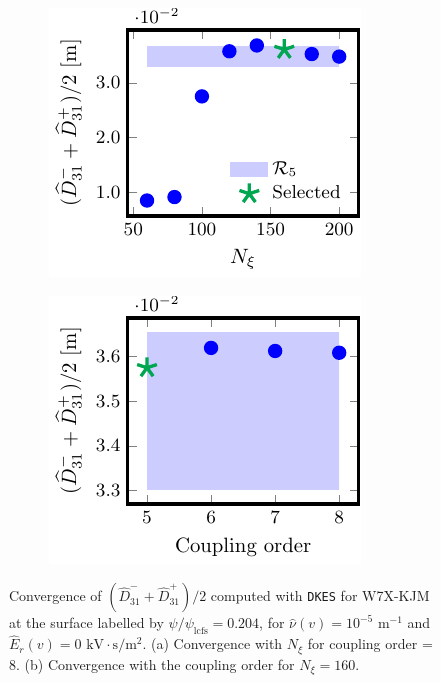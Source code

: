 \documentclass[10pt]{iopart}
\newcommand{\DKES}{{\texttt{DKES}}}
\begin{document}
\begin{figure}[t]
	\centering	
	\begin{subfigure}[t]{0.32\textwidth}
		\includegraphics{DKES-Convergence-Legendre-W7X-KJM-s0204-Er-0-D31-Detail}
%		
		\caption{}
		\label{subfig:DKES_D31_convergence_Legendre_W7X_KJM_0204_Erho_0_Detail}
	\end{subfigure}
	\begin{subfigure}[t]{0.32\textwidth}
		\includegraphics{DKES-Convergence-theta-zeta-W7X-KJM-s0204-Er-0-D31}
		\caption{}
		\label{subfig:DKES_D31_convergence_Coupling_parameter_W7X_KJM_0204_Erho_0}
	\end{subfigure}
	
	
	\caption{Convergence of $(\widehat{D}_{31}^- + \widehat{D}_{31}^+) /2$ computed with {\DKES} for W7X-KJM at the surface labelled by $\psi/\psi_{\text{lcfs}}=0.204$, for $\hat{\nu}(v)=10^{-5}$ $\text{m}^{-1}$ and $\widehat{E}_r(v)=0$ $\text{kV}\cdot\text{s}/\text{m}^2$. (a) Convergence with $N_\xi$ for coupling order = 8. (b) Convergence with the coupling order for $N_\xi=160 $.}
	\label{fig:DKES_Convergence_W7X_KJM_Er_0}
\end{figure}
\end{document}
